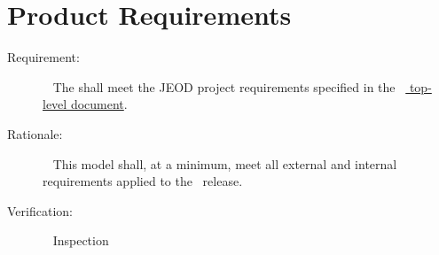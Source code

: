 %
% 

\chapter{Product Requirements}
\label{ch:reqt}

\label{reqt:toplevel}
\begin{description}
\item[Requirement:]\ \newline
  The \ModelDesc shall meet the JEOD project requirements specified in
  the \JEODid\
  \hyperref{file:\JEODHOME/docs/JEOD.pdf}{part1}{reqt}{ top-level
  document}.
\item[Rationale:]\ \newline
  This model shall, at a minimum,  meet all external and
  internal requirements 
  applied to the \JEODid\ release.
\item[Verification:]\ \newline
  Inspection 
\end{description}


